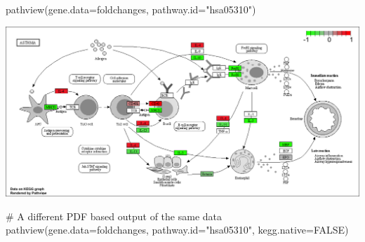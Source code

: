 \documentclass[
  letterpaper,
  DIV=11,
  numbers=noendperiod]{scrartcl}
\newenvironment{Shaded}{\begin{snugshade}}{\end{snugshade}}
\newcommand{\AttributeTok}[1]{\textcolor[rgb]{0.40,0.45,0.13}{#1}}
\newcommand{\CommentTok}[1]{\textcolor[rgb]{0.37,0.37,0.37}{#1}}
\newcommand{\ConstantTok}[1]{\textcolor[rgb]{0.56,0.35,0.01}{#1}}
\newcommand{\FunctionTok}[1]{\textcolor[rgb]{0.28,0.35,0.67}{#1}}
\newcommand{\NormalTok}[1]{\textcolor[rgb]{0.00,0.23,0.31}{#1}}
\newcommand{\StringTok}[1]{\textcolor[rgb]{0.13,0.47,0.30}{#1}}
\begin{document}
\begin{Shaded}
\begin{Highlighting}[]
\FunctionTok{pathview}\NormalTok{(}\AttributeTok{gene.data=}\NormalTok{foldchanges, }\AttributeTok{pathway.id=}\StringTok{"hsa05310"}\NormalTok{)}
\end{Highlighting}
\end{Shaded}

\includegraphics{hsa05310.pathview.png}

\begin{Shaded}
\begin{Highlighting}[]
\CommentTok{\# A different PDF based output of the same data}
\FunctionTok{pathview}\NormalTok{(}\AttributeTok{gene.data=}\NormalTok{foldchanges, }\AttributeTok{pathway.id=}\StringTok{"hsa05310"}\NormalTok{, }\AttributeTok{kegg.native=}\ConstantTok{FALSE}\NormalTok{)}
\end{Highlighting}
\end{Shaded}
\end{document}
